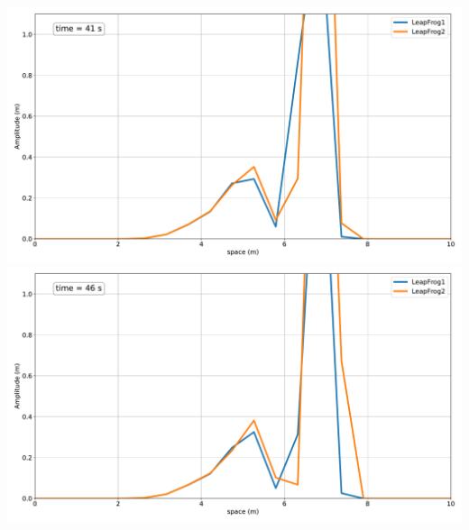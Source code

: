 \includegraphics[width=\linewidth]{../BurgersEquation/images/Lin3_Lin48.pdf}
\includegraphics[width=\linewidth]{../BurgersEquation/images/Lin3_Lin49.pdf}

